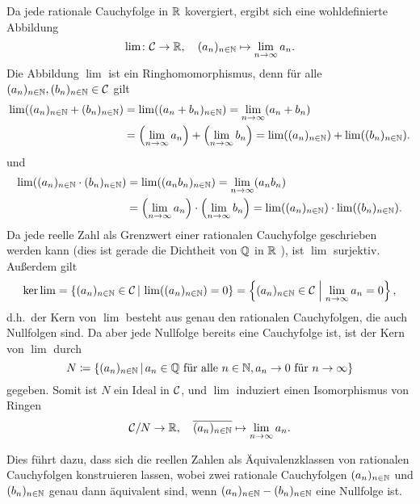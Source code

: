 \begin{example}
\begin{enumerate}
      Da jede rationale Cauchyfolge in $\mathbb{R}$ kovergiert, ergibt sich eine wohldefinierte Abbildung
      \[
                \lim
        \colon  \mathcal{C}
        \to     \mathbb{R},
        \quad   (a_n)_{n \in \mathbb{N}}
        \mapsto \lim_{n \to \infty} a_n.
      \]
      Die Abbildung $\lim$ ist ein Ringhomomorphismus, denn für alle $(a_n)_{n \in \mathbb{N}}, (b_n)_{n \in \mathbb{N}} \in \mathcal{C}$ gilt
      \begin{align*}
            \lim( (a_n)_{n \in \mathbb{N}} + (b_n)_{n \in \mathbb{N}} )
        &=  \lim( (a_n + b_n)_{n \in \mathbb{N}} )
          =  \lim_{n \to \infty} (a_n + b_n)
        \\
        &=  \left( \lim_{n \to \infty} a_n \right) + \left( \lim_{n \to \infty} b_n \right)
          =  \lim( (a_n)_{n \in \mathbb{N}} ) + \lim( (b_n)_{n \in \mathbb{N}} ).
      \end{align*}
      und
      \begin{align*}
            \lim( (a_n)_{n \in \mathbb{N}} \cdot (b_n)_{n \in \mathbb{N}} )
        &=  \lim( (a_n b_n)_{n \in \mathbb{N}} )
        =  \lim_{n \to \infty} (a_n b_n)
        \\
        &=  \left( \lim_{n \to \infty} a_n \right) \cdot \left( \lim_{n \to \infty} b_n \right)
        =  \lim( (a_n)_{n \in \mathbb{N}} ) \cdot \lim( (b_n)_{n \in \mathbb{N}} ).
      \end{align*}
      Da jede reelle Zahl als Grenzwert einer rationalen Cauchyfolge geschrieben werden kann (dies ist gerade die Dichtheit von $\mathbb{Q}$ in $\mathbb{R}$ ), ist $\lim$ surjektiv.
      Außerdem gilt
      \[
          \ker \lim
        = \{
            (a_n)_{n \in \mathbb{N}} \in \mathcal{C}
          \,|\,
            \lim( (a_n)_{n \in \mathbb{N}} ) = 0
          \}
        = \left\{
            (a_n)_{n \in \mathbb{N}} \in \mathcal{C}
          \;\middle|\;
            \lim_{n \to \infty} a_n = 0
          \right\},
      \]
      d.h.\ der Kern von $\lim$ besteht aus genau den rationalen Cauchyfolgen, die auch Nullfolgen sind.
      Da aber jede Nullfolge bereits eine Cauchyfolge ist, ist der Kern von $\lim$ durch
      \[
                  N
        \coloneqq \{
                    (a_n)_{n \in \mathbb{N}}
                  \,|\,
                    \text{$a_n \in \mathbb{Q}$ für alle $n \in \mathbb{N}$},
                    \text{$a_n \to 0$ für $n \to \infty$}
                  \}
      \]
      gegeben.
      Somit ist $N$ ein Ideal in $\mathcal{C}$, und $\lim$ induziert einen Isomorphismus von Ringen
      \[
                \mathcal{C}/N
        \to     \mathbb{R},
        \quad   \overline{ (a_n)_{n \in \mathbb{N}} }
        \mapsto \lim_{n \to \infty} a_n.
      \]
      
      Dies führt dazu, dass sich die reellen Zahlen als Äquivalenzklassen von rationalen Cauchyfolgen konstruieren lassen, wobei zwei rationale Cauchyfolgen $(a_n)_{n \in \mathbb{N}}$ und $(b_n)_{n \in \mathbb{N}}$ genau dann äquivalent sind, wenn $(a_n)_{n \in \mathbb{N}} - (b_n)_{n \in \mathbb{N}}$ eine Nullfolge ist.
  \end{enumerate}
\end{example}










